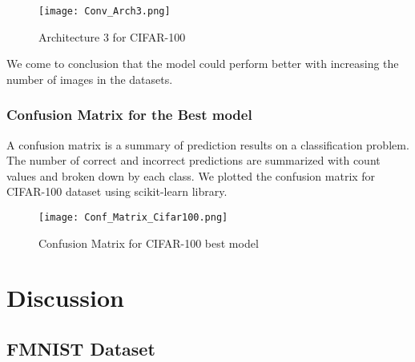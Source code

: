 \documentclass{article}
\begin{document}
\begin{figure}[H]
    \centering
    \texttt{[image: Conv\_Arch3.png]}
    \caption{Architecture 3 for CIFAR-100}
    \label{fig:Arch3_CNN}
\end{figure}

 We come to conclusion that the model could perform better with increasing the number of images in the datasets.

\subsubsection{Confusion Matrix for the Best model}
A confusion matrix is a summary of prediction results on a classification problem. The number of correct and incorrect predictions are summarized with count values and broken down by each class. We plotted the confusion matrix for CIFAR-100 dataset using scikit-learn library.

\begin{figure}[H]
    \centering
    \texttt{[image: Conf\_Matrix\_Cifar100.png]}
    \caption{Confusion Matrix for CIFAR-100 best model}
    \label{fig:Conf_matrix_Cifar100}
\end{figure}

\section{Discussion}
\subsection{FMNIST Dataset}
\end{document}
